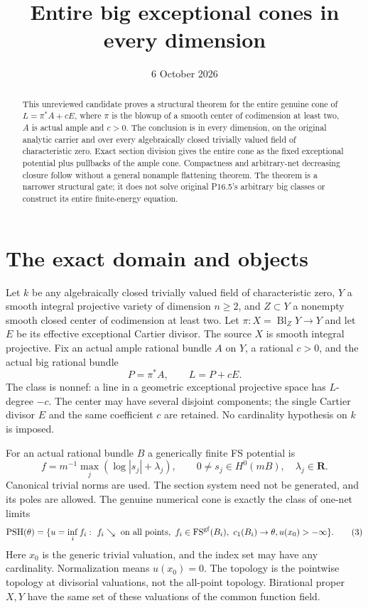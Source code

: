 \documentclass[11pt]{article}
\title{Entire big exceptional cones in every dimension}
\author{}
\date{6 October 2026}
\newcommand{\PSH}{\operatorname{PSH}}
\newcommand{\FS}{\operatorname{FS}}
\begin{document}
\maketitle
\begin{abstract}
This unreviewed candidate proves a structural theorem for the entire
genuine cone of $L=\pi^*A+cE$, where $\pi$ is the blowup of a
smooth center of codimension at least two, $A$ is actual ample and
$c>0$. The conclusion is in every dimension, on the original
analytic carrier and over every algebraically closed trivially
valued field of characteristic zero. Exact section division gives
the entire cone as the fixed exceptional potential plus pullbacks
of the ample cone. Compactness and arbitrary-net decreasing closure
follow without a general nonample flattening theorem. The theorem
is a narrower structural gate; it does not solve original P16.5's
arbitrary big classes or construct its entire finite-energy equation.
\end{abstract}

\section{The exact domain and objects}
Let $k$ be any algebraically closed trivially valued field of
characteristic zero, $Y$ a smooth integral projective variety of
dimension $n\geq2$, and $Z\subset Y$ a nonempty smooth closed
center of codimension at least two. Let
$\pi:X=\operatorname{Bl}_Z Y\to Y$ and let $E$ be its
effective exceptional Cartier divisor. The source $X$ is smooth
integral projective. Fix an actual ample rational bundle $A$ on $Y$,
a rational $c>0$, and the actual big rational bundle
\[
 P=\pi^*A,\qquad L=P+cE.                                  \tag{1}
\]
The class is nonnef: a line in a geometric exceptional projective
space has $L$-degree $-c$. The center may have several disjoint
components; the single Cartier divisor $E$ and the same coefficient
$c$ are retained. No cardinality hypothesis on $k$ is imposed.

For an actual rational bundle $B$ a generically finite FS potential is
\[
 f=m^{-1}\max_j(\log|s_j|+\lambda_j),\qquad
 0\ne s_j\in H^0(mB),\quad \lambda_j\in\mathbf R.          \tag{2}
\]
Canonical trivial norms are used. The section system need not be
generated, and its poles are allowed. The genuine numerical cone is
exactly the class of one-net limits
\[
 \PSH(\theta)=\{u=\inf_i f_i:\ f_i\searrow\text{ on all points},
  \ f_i\in\FS^{\rm gf}(B_i),\ c_1(B_i)\to\theta,
                         u(x_0)>-\infty\}.               \tag{3}
\]
Here $x_0$ is the generic trivial valuation, and the index set may
have any cardinality. Normalization means $u(x_0)=0$. The topology
is the pointwise topology at divisorial valuations, not the all-point
topology. Birational proper $X,Y$ have the same set of these
valuations of the common function field.
\end{document}
